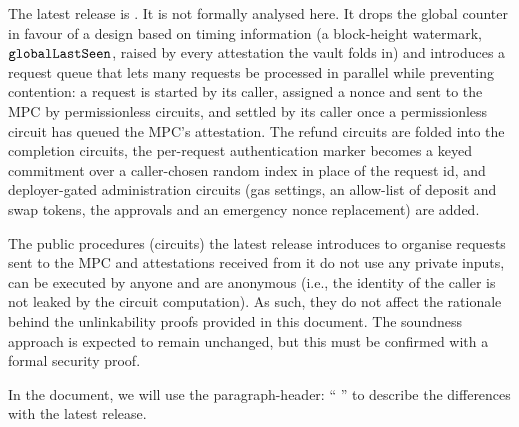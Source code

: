 \documentclass[11pt]{article}
\begin{document}
The latest release is \href{\latestContractUrl}{\texttt{\latestTag}}. It is not formally
analysed here. It drops the global counter in favour of a design based on timing information
(a block-height watermark, $\mathtt{globalLastSeen}$, raised by every attestation the vault folds in) and
introduces a request queue that lets many requests be processed in parallel while preventing
contention: a request is started by its caller, assigned a nonce and sent to the MPC by
permissionless circuits, and settled by its caller once a permissionless circuit has queued
the MPC's attestation. The refund circuits are folded into the completion circuits, the
per-request authentication marker becomes a keyed commitment over a caller-chosen random
index in place of the request id, and deployer-gated administration circuits (gas settings,
an allow-list of deposit and swap tokens, the approvals and an emergency nonce replacement)
are added.

The public procedures (circuits) the latest release introduces to organise requests sent to
the MPC and attestations received from it do not use any private inputs, can be executed by
anyone and are anonymous (i.e., the identity of the caller is not leaked by the circuit
computation). As such, they do not affect the rationale behind the unlinkability proofs
provided in this document. The soundness approach is expected to remain unchanged, but this
must be confirmed with a formal security proof.

\vspace{5pt}
In the document, we will use  the paragraph-header: ``
''
to  describe the differences with the latest release.

\newpage








\nocite{*}


\end{document}
